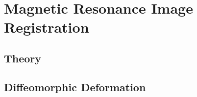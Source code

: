 \section{Magnetic Resonance Image Registration}

\subsection{Theory}

\subsection{Diffeomorphic Deformation}

